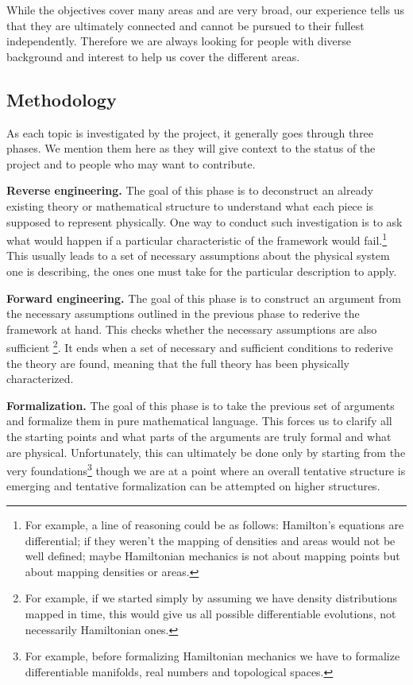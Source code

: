 \documentclass[twocolumn]{article}
\begin{document}
While the objectives cover many areas and are very broad, our experience tells us that they are ultimately connected and cannot be pursued to their fullest independently. Therefore we are always looking for people with diverse background and interest to help us cover the different areas.

\subsection{Methodology}

As each topic is investigated by the project, it generally goes through three phases. We mention them here as they will give context to the status of the project and to people who may want to contribute.

\textbf{Reverse engineering.} The goal of this phase is to deconstruct an already existing theory or mathematical structure to understand what each piece is supposed to represent physically. One way to conduct such investigation is to ask what would happen if a particular characteristic of the framework would fail.\footnote{For example, a line of reasoning could be as follows: Hamilton's equations are differential; if they weren't the mapping of densities and areas would not be well defined; maybe Hamiltonian mechanics is not about mapping points but about mapping densities or areas.} This usually leads to a set of necessary assumptions about the physical system one is describing, the ones one must take for the particular description to apply.

\textbf{Forward engineering.} The goal of this phase is to construct an argument from the necessary assumptions outlined in the previous phase to rederive the framework at hand. This checks whether the necessary assumptions are also sufficient \footnote{For example, if we started simply by assuming we have density distributions mapped in time, this would give us all possible differentiable evolutions, not necessarily Hamiltonian ones.}. It ends when a set of necessary and sufficient conditions to rederive the theory are found, meaning that the full theory has been physically characterized.

\textbf{Formalization.} The goal of this phase is to take the previous set of arguments and formalize them in pure mathematical language. This forces us to clarify all the starting points and what parts of the arguments are truly formal and what are physical. Unfortunately, this can ultimately be done only by starting from the very foundations\footnote{For example, before formalizing Hamiltonian mechanics we have to formalize differentiable manifolds, real numbers and topological spaces.} though we are at a point where an overall tentative structure is emerging and tentative formalization can be attempted on higher structures.
\end{document}
